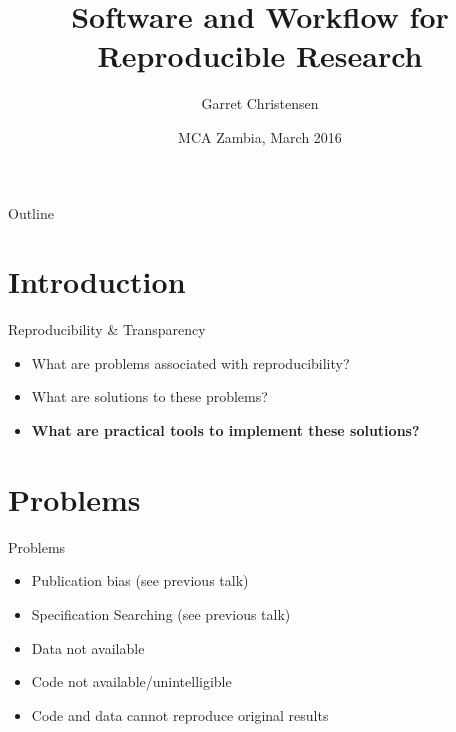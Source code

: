 \documentclass{beamer}
\title[Software and Workflow] %
{Software and Workflow for Reproducible Research}
\author[Christensen] %
{Garret Christensen\inst{1}}
\institute[UC Berkeley, Berkeley Initiatiative for Transparency in the Social Sciences] %
{
  \inst{1}%
  UC Berkeley: Berkeley Initiative for Transparency in the Social Sciences\\
  Berkeley Institute for Data Science
}
\date[Short Occasion] %
{MCA Zambia, March 2016}
\begin{document}


\begin{frame}
  \titlepage
\end{frame}

\begin{frame}{Outline}
  \tableofcontents
\end{frame}

\section{Introduction}

\begin{frame}{Reproducibility \& Transparency}
\begin{itemize}
\item What are problems associated with reproducibility?
\item What are solutions to these problems?
\item \textbf{What are practical tools to implement these solutions?}
\end{itemize}
\end{frame}
\section{Problems}
\begin{frame}{Problems}
 \begin{itemize}
 \item Publication bias (see previous talk)
 \item Specification Searching (see previous talk)
 \item Data not available
 \item Code not available/unintelligible
 \item Code and data cannot reproduce original results
 \end{itemize}
\end{frame}
\end{document}
